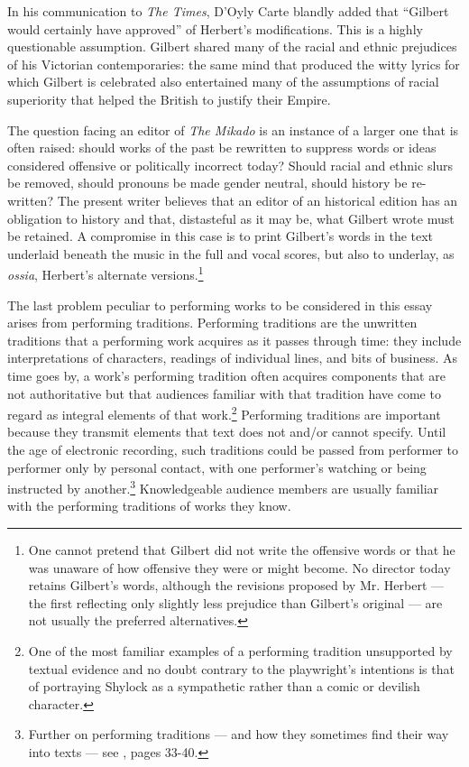 \begin{paper}
\begin{figure}[H]
\end{figure}

\noindent In his communication to \emph{The Times}, D'Oyly Carte blandly added
that ``Gilbert would certainly have approved'' of Herbert's
modifications. This is a highly questionable assumption. Gilbert shared
many of the racial and ethnic prejudices of his Victorian
contemporaries: the same mind that produced the witty lyrics for which
Gilbert is celebrated also entertained many of the assumptions of racial
superiority that helped the British to justify their Empire.

The question facing an editor of \emph{The Mikado} is an instance of a
larger one that is often raised: should works of the past be rewritten
to suppress words or ideas considered offensive or politically incorrect
today? Should racial and ethnic slurs be removed, should pronouns be
made gender neutral, should history be re-written? The present writer
believes that an editor of an historical edition has an obligation to
history and that, distasteful as it may be, what Gilbert wrote must be
retained. A compromise in this case is to print Gilbert's words in the
text underlaid beneath the music in the full and vocal scores, but also
to underlay, as \emph{ossia}, Herbert's alternate versions.\footnote{One
  cannot pretend that Gilbert did not write the offensive words or that
  he was unaware of how offensive they were or might become. No director
  today retains Gilbert's words, although the revisions proposed by Mr.
  Herbert --- the first reflecting only slightly less prejudice than
  Gilbert's original --- are not usually the preferred alternatives.}

The last problem peculiar to performing works to be considered in this essay
arises from performing traditions. Performing traditions are the
unwritten traditions that a performing work acquires as it passes
through time: they include interpretations of characters, readings of
individual lines, and bits of business. As time goes by, a work's
performing tradition often acquires components that are not
authoritative but that audiences familiar with that tradition have come
to regard as integral elements of that work.\footnote{One of the most familiar
examples of a performing tradition unsupported by textual evidence and
no doubt contrary to the playwright's intentions is that of portraying
Shylock as a sympathetic rather than a comic or devilish character.}
Performing traditions are important because they transmit elements that
text does not and/or cannot specify. Until the age of electronic
recording, such traditions could be passed from performer to performer
only by personal contact, with one performer's watching or being
instructed by another.\footnote{Further on performing traditions --- and
  how they sometimes find their way into texts --- see \citealt{broude_performance_2011}, pages
  33-40.} Knowledgeable audience members are usually familiar with the
performing traditions of works they know.


\end{paper}
